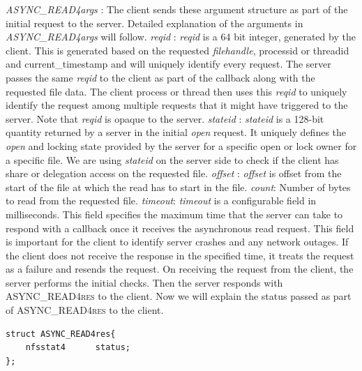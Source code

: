 \noindent\textit{ASYNC\_READ4args} : The client sends these argument structure as part of the initial request to the server. Detailed explanation of the arguments in \textit{ASYNC\_READ4args} will follow. 
\hfill \break \newline
\noindent\textit{reqid} : \textit{reqid} is a 64 bit integer, generated by the client. This is generated based on the requested \textit{filehandle}, processid or threadid and current\_timestamp and will uniquely identify every request. The server passes the same \textit{reqid} to the client as part of the callback along with the requested file data. The client process or thread then uses this  \textit{reqid} to uniquely identify the request among multiple requests that it might have triggered to the server. Note that \textit{reqid} is opaque to the server.
\hfill \break \newline
\noindent\textit{stateid} : \textit{stateid} is a 128-bit quantity returned by a server in the initial \textit{open} request. It uniquely defines the \textit{open} and locking state provided by the server for a specific open or lock owner for a specific file. We are using \textit{stateid} on the server side to check if the client has share or delegation access on the requested file. 
\hfill \break \newline
\noindent\textit{offset} : \textit{offset} is offset from the start of the file at which the read has to start in the file. 
\hfill \break \newline
\noindent\textit{count}: Number of bytes to read from the requested file.
\hfill \break \newline
\noindent\textit{timeout}: \textit{timeout} is a configurable field in milliseconds. This field specifies the maximum time that the server can take to respond with a callback once it receives the asynchronous read request. This field is important for the client to identify server crashes and any network outages. If the client does not receive the response in the specified time, it treats the request as a failure and resends the request.     
\hfill \break \newline
\noindent On receiving the request from the client, the server performs the initial checks. Then the server responds with \textsc{ASYNC\_READ4res} to the client. Now we will explain the status passed as part of \textsc{ASYNC\_READ4res} to the client.  

\begin{lstlisting}
struct ASYNC_READ4res{
	nfsstat4	  status;
};
\end{lstlisting}

